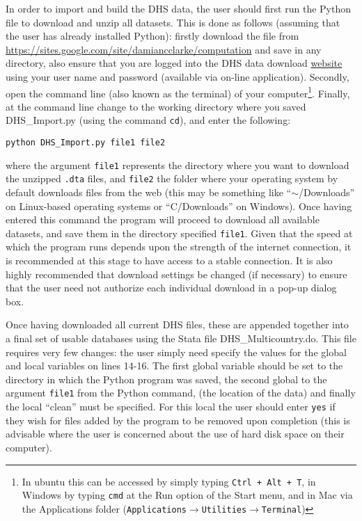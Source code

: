 \documentclass{article}[11pt,subeqn]
\begin{document}
\begin{spacing}{1.25}
In order to import and build the DHS data, the user should first run the Python file to download and unzip all datasets. 
This is done as follows (assuming that the user has already installed Python): firstly download the file from \url{https://sites.google.com/site/damiancclarke/computation} and save in any directory, also ensure that you are 
logged into the DHS data download \href{http://www.measuredhs.com/data/available-datasets.cfm}{website} 
using your user name and password (available via on-line application).  Secondly, open the command line 
(also known as the terminal) of your computer\footnote{In ubuntu this can be accessed by simply typing 
\texttt{Ctrl + Alt + T}, in Windows by typing \texttt{cmd} at the Run option of the Start menu, and in Mac 
via the Applications folder (\texttt{Applications$\rightarrow$Utilities$\rightarrow$Terminal})}.  Finally,
at the command line change to the working directory where you saved DHS\_Import.py (using the command 
\texttt{cd}), and enter the following:

\texttt{python DHS\_Import.py file1 file2}

\noindent where the argument \texttt{file1} represents the directory where you want to download the unzipped 
\texttt{.dta} files, and \texttt{file2} the folder where your operating system by default downloads files from 
the web (this may be something like ``$\sim$\slash Downloads'' on Linux-based operating systems or 
``C\slash Downloads'' on Windows).  Once having entered this command the program will proceed to download
all available datasets, and save them in the directory specified \texttt{file1}.  Given that the speed at which
the program runs depends upon the strength of the internet connection, it is recommended at this stage to have
access to a stable connection.  It is also highly recommended that download settings be changed (if necessary) to 
ensure that the user need not authorize each individual download in a pop-up dialog box.

Once having downloaded all current DHS files, these are appended together into a final set of usable databases
using the Stata file DHS\_Multicountry.do.  This file requires very few changes: the user simply need specify
the values for the global and local variables on lines 14-16.  The first global variable should be set to the directory
in which the Python program was saved, the second global to the argument \texttt{file1} from the Python command,
(the location of the data) and finally the local ``clean'' must be specified.  For this local the user should enter
\texttt{yes} if they wish for files added by the program to be removed upon completion (this is advisable where
the user is concerned about the use of hard disk space on their computer).


\end{spacing}
\end{document}

